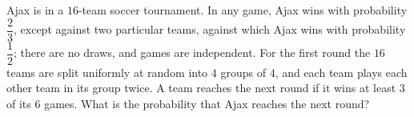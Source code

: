 Ajax is in a $16$-team soccer tournament. In any game, Ajax wins with probability $\dfrac23$, except against two particular teams, against which Ajax wins with probability $\dfrac12$; there are no draws, and games are independent. For the first round the $16$ teams are split uniformly at random into $4$ groups of $4$, and each team plays each other team in its group twice. A team reaches the next round if it wins at least $3$ of its $6$ games. What is the probability that Ajax reaches the next round?
